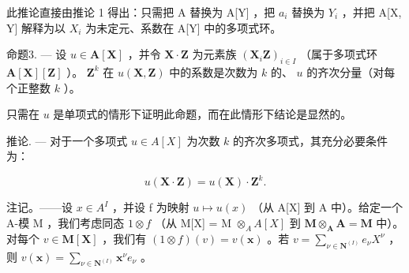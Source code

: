 此推论直接由推论 1 得出：只需把 A 替换为 A{[}Y{]} ，把 \(a_{i}\) 替换为 \(Y_{i}\) ，并把 A{[}X, Y{]} 解释为以 \(X_{i}\) 为未定元、系数在 A{[}Y{]} 中的多项式环。

命题3. --- 设 \(u \in \mathbf{A}[\mathbf{X}]\) ，并令 \(\mathbf{X} \cdot \mathbf{Z}\) 为元素族 \((\mathbf{X}_i\mathbf{Z})_{i \in I}\) （属于多项式环 \(\mathbf{A}[\mathbf{X}][\mathbf{Z}]\) ）。 \(\mathbf{Z}^k\) 在 \(u(\mathbf{X}, \mathbf{Z})\) 中的系数是次数为 \(k\) 的、 \(u\) 的齐次分量（对每个正整数 \(k\) ）。

只需在 \(u\) 是单项式的情形下证明此命题，而在此情形下结论是显然的。

推论. --- 对于一个多项式 \(u \in A[X]\) 为次数 \(k\) 的齐次多项式，其充分必要条件为：

\[
u (\mathbf {X} \cdot \mathbf {Z}) = u (\mathbf {X}) \cdot \mathbf {Z} ^ {k}.
\]

注记。——设 \(x \in A^{I}\) ，并设 f 为映射 \(u \mapsto u(x)\) （从 A{[}X{]} 到 A 中）。给定一个 A-模 M ，我们考虑同态 \(1 \otimes f\) （从 M{[}X{]} = M \(\otimes_{A} A[X]\) 到 \(\mathbf{M} \otimes_{\mathbf{A}} \mathbf{A} = \mathbf{M}\) 中）。对每个 \(v \in \mathbf{M}[\mathbf{X}]\) ，我们有 \((1 \otimes f)(v) = v(\mathbf{x})\) 。若 \(v = \sum_{\nu \in \mathbf{N}^{(I)}} e_{\nu} X^{\nu}\) ，则 \(v(\mathbf{x}) = \sum_{\nu \in \mathbf{N}^{(I)}} \mathbf{x}^{\nu} e_{\nu}\) 。

